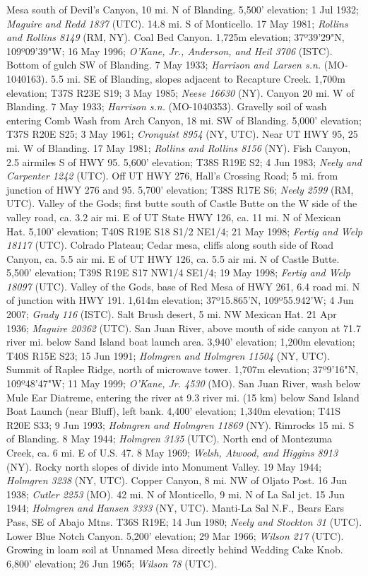 Mesa south of Devil's Canyon, 10 mi. N of Blanding. 5,500' elevation;
1 Jul 1932; \textit{Maguire and Redd 1837} (UTC).
14.8 mi. S of Monticello. 17 May 1981; \textit{Rollins and Rollins 8149} (RM, NY).
Coal Bed Canyon. 1,725m elevation; 37º39'29"N, 109º09'39"W; 16 May 1996;
\textit{O'Kane, Jr., Anderson, and Heil 3706} (ISTC).
Bottom of gulch SW of Blanding. 7 May 1933;
\textit{Harrison and Larsen s.n.} (MO-1040163).
5.5 mi. SE of Blanding, slopes adjacent to Recapture Creek. 1,700m elevation;
T37S R23E S19; 3 May 1985; \textit{Neese 16630} (NY).
Canyon 20 mi. W of Blanding. 7 May 1933; \textit{Harrison s.n.} (MO-1040353).
Gravelly soil of wash entering Comb Wash from Arch Canyon, 18 mi. SW of Blanding.
5,000' elevation; T37S R20E S25; 3 May 1961; \textit{Cronquist 8954} (NY, UTC).
Near UT HWY 95, 25 mi. W of Blanding. 17 May 1981;
\textit{Rollins and Rollins 8156} (NY).
Fish Canyon, 2.5 airmiles S of HWY 95. 5,600' elevation; T38S R19E S2;
4 Jun 1983; \textit{Neely and Carpenter 1242} (UTC).
Off UT HWY 276, Hall's Crossing Road; 5 mi. from junction of HWY 276 and 95.
5,700' elevation; T38S R17E S6; \textit{Neely 2599} (RM, UTC).
Valley of the Gods; first butte south of Castle Butte on the W side of the
valley road, ca. 3.2 air mi. E of UT State HWY 126, ca. 11 mi. N of Mexican Hat.
5,100' elevation; T40S R19E S18 S1/2 NE1/4; 21 May 1998;
\textit{Fertig and Welp 18117} (UTC).
Colrado Plateau; Cedar mesa, cliffs along south side of Road Canyon, ca. 5.5 air
mi. E of UT HWY 126, ca. 5.5 air mi. N of Castle Butte. 5,500' elevation;
T39S R19E S17 NW1/4 SE1/4; 19 May 1998; \textit{Fertig and Welp 18097} (UTC).
Valley of the Gods, base of Red Mesa of HWY 261, 6.4 road mi. N of junction with
HWY 191. 1,614m elevation; 37º15.865'N, 109º55.942'W; 4 Jun 2007;
\textit{Grady 116} (ISTC).
Salt Brush desert, 5 mi. NW Mexican Hat. 21 Apr 1936;
\textit{Maguire 20362} (UTC).
San Juan River, above mouth of side canyon at 71.7 river mi. below Sand Island
boat launch area. 3,940' elevation; 1,200m elevation; T40S R15E S23;
15 Jun 1991; \textit{Holmgren and Holmgren 11504} (NY, UTC).
Summit of Raplee Ridge, north of microwave tower. 1,707m elevation;
37º9'16"N, 109º48'47"W; 11 May 1999; \textit{O'Kane, Jr. 4530} (MO).
San Juan River, wash below Mule Ear Diatreme, entering the river at 9.3 river mi.
(15 km) below Sand Island Boat Launch (near Bluff), left bank. 4,400' elevation;
1,340m elevation; T41S R20E S33; 9 Jun 1993;
\textit{Holmgren and Holmgren 11869} (NY).
Rimrocks 15 mi. S of Blanding. 8 May 1944; \textit{Holmgren 3135} (UTC).
North end of Montezuma Creek, ca. 6 mi. E of U.S. 47. 8 May 1969;
\textit{Welsh, Atwood, and Higgins 8913} (NY).
Rocky north slopes of divide into Monument Valley. 19 May 1944;
\textit{Holmgren 3238} (NY, UTC).
Copper Canyon, 8 mi. NW of Oljato Post. 16 Jun 1938; \textit{Cutler 2253} (MO).
42 mi. N of Monticello, 9 mi. N of La Sal jct. 15 Jun 1944;
\textit{Holmgren and Hansen 3333} (NY, UTC).
Manti-La Sal N.F., Bears Ears Pass, SE of Abajo Mtns. T36S R19E; 14 Jun 1980;
\textit{Neely and Stockton 31} (UTC).
Lower Blue Notch Canyon. 5,200' elevation; 29 Mar 1966; \textit{Wilson 217} (UTC).
Growing in loam soil at Unnamed Mesa directly behind Wedding Cake Knob.
6,800' elevation; 26 Jun 1965; \textit{Wilson 78} (UTC).
